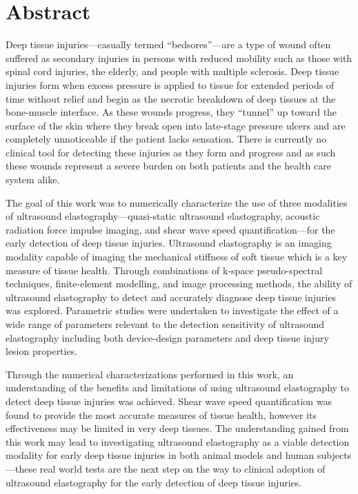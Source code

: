 \chapter*{Abstract}
	\doublespacing

	Deep tissue injuries---casually termed ``bedsores''---are a type of wound often suffered as secondary injuries in persons with reduced mobility such as those with spinal cord injuries, the elderly, and people with multiple sclerosis. Deep tissue injuries form when excess pressure is applied to tissue for extended periods of time without relief and begin as the necrotic breakdown of deep tissues at the bone-muscle interface. As these wounds progress, they ``tunnel'' up toward the surface of the skin where they break open into late-stage pressure ulcers and are completely unnoticeable if the patient lacks sensation. There is currently no clinical tool for detecting these injuries as they form and progress and as such these wounds represent a severe burden on both patients and the health care system alike.

	The goal of this work was to numerically characterize the use of three modalities of ultrasound elastography---quasi-static ultrasound elastography, acoustic radiation force impulse imaging, and shear wave speed quantification---for the early detection of deep tissue injuries. Ultrasound elastography is an imaging modality capable of imaging the mechanical stiffness of soft tissue which is a key measure of tissue health. Through combinations of k-space pseudo-spectral techniques, finite-element modelling, and image processing methods, the ability of ultrasound elastography to detect and accurately diagnose deep tissue injuries was explored. Parametric studies were undertaken to investigate the effect of a wide range of parameters relevant to the detection sensitivity of ultrasound elastography including both device-design parameters and deep tissue injury lesion properties.

	Through the numerical characterizations performed in this work, an understanding of the benefits and limitations of using ultrasound elastography to detect deep tissue injuries was achieved. Shear wave speed quantification was found to provide the most accurate measures of tissue health, however its effectiveness may be limited in very deep tissues. The understanding gained from this work may lead to investigating ultrasound elastography as a viable detection modality for early deep tissue injuries in both animal models and human subjects---these real world tests are the next step on the way to clinical adoption of ultrasound elastography for the early detection of deep tissue injuries.